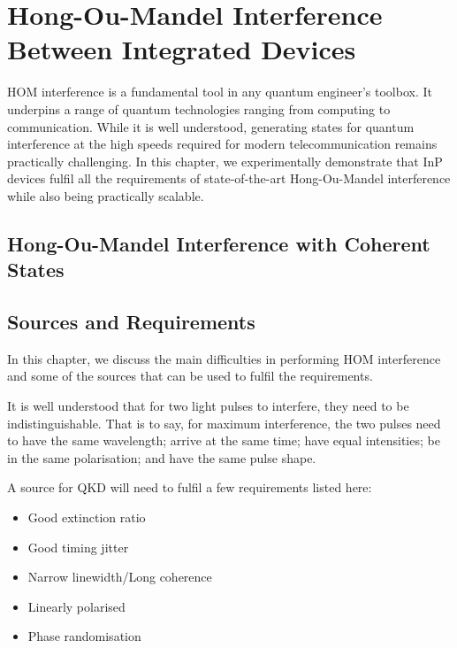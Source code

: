%
%
\glsresetall
\graphicspath{{./chapters/chapter03/fig03/}}

\let\textcircled=\pgftextcircled
\chapter[HOM Interference Between Integrated Devices]{Hong-Ou-Mandel Interference Between Integrated Devices}
\label{chap:hom}

\ac{HOM} interference is a fundamental tool in any quantum engineer's toolbox. It underpins a range of quantum technologies ranging from computing to communication. While it is well understood, generating states for quantum interference at the high speeds required for modern telecommunication remains practically challenging. In this chapter, we experimentally demonstrate that \ac{InP} devices fulfil all the requirements of state-of-the-art Hong-Ou-Mandel interference while also being practically scalable. 

\section{Hong-Ou-Mandel Interference with Coherent States}

\section{Sources and Requirements}
\label{sec:sources}

In this chapter, we discuss the main difficulties in performing	\ac{HOM} interference and some of the sources that can be used to fulfil the requirements. 

It is well understood that for two light pulses to interfere, they need to be indistinguishable. That is to say, for maximum interference, the two pulses need to have the same wavelength; arrive at the same time; have equal intensities; be in the same polarisation; and have the same pulse shape.

A source for \ac{QKD} will need to fulfil a few requirements listed here:

\begin{itemize}
	\item Good extinction ratio
	\item Good timing jitter
	\item Narrow linewidth/Long coherence
	\item Linearly polarised
	\item Phase randomisation
\end{itemize}

